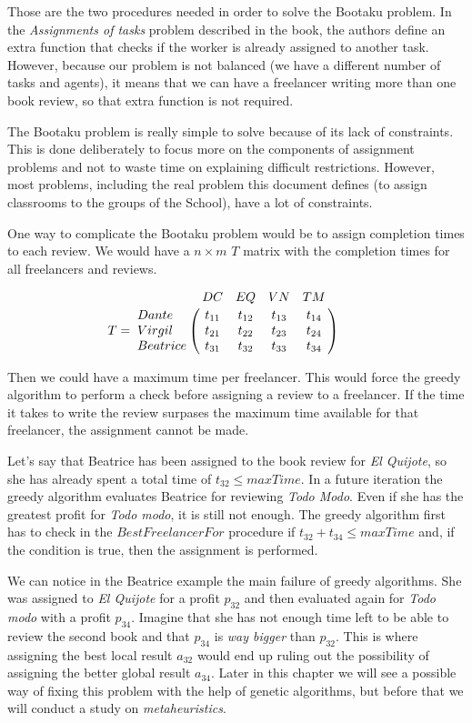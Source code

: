 Those are the two procedures needed in order to solve the Bootaku problem. In the \textit{Assignments of tasks} problem described in the book, the authors define an extra function that checks if the worker is already assigned to another task. However, because our problem is not balanced (we have a different number of tasks and agents), it means that we can have a freelancer writing more than one book review, so that extra function is not required.

The Bootaku problem is really simple to solve because of its lack of constraints. This is done deliberately to focus more on the components of assignment problems and not to waste time on explaining difficult restrictions. However, most problems, including the real problem this document defines (to assign classrooms to the groups of the School), have a lot of constraints. 

One way to complicate the Bootaku problem would be to assign completion times to each review. We would have a $n \times m$ $T$ matrix with the completion times for all freelancers and reviews.

\begin{equation}
    T = \bordermatrix{
        & DC & EQ & VN & TM \cr
        Dante & t_{11} & t_{12} & t_{13} & t_{14} \cr
        Virgil & t_{21} & t_{22} & t_{23} & t_{24} \cr
        Beatrice & t_{31} & t_{32} & t_{33} & t_{34} 
    } \qquad
\end{equation}

Then we could have a maximum time per freelancer. This would force the greedy algorithm to perform a check before assigning a review to a freelancer. If the time it takes to write the review surpases the maximum time available for that freelancer, the assignment cannot be made. 

Let's say that Beatrice has been assigned to the book review for \textit{El Quijote}, so she has already spent a total time of $t_{32} \leq maxTime$. In a future iteration the greedy algorithm evaluates Beatrice for reviewing \textit{Todo Modo}. Even if she has the greatest profit for \textit{Todo modo}, it is still not enough. The greedy algorithm first has to check in the $BestFreelancerFor$ procedure if $t_{32} + t_{34} \leq maxTime$ and, if the condition is true, then the assignment is performed. 

We can notice in the Beatrice example the main failure of greedy algorithms. She was assigned to \textit{El Quijote} for a profit $p_{32}$ and then evaluated again for \textit{Todo modo} with a profit $p_{34}$. Imagine that she has not enough time left to be able to review the second book and that $p_{34}$ is \textit{way bigger} than $p_{32}$. This is where assigning the best local result $a_{32}$ would end up ruling out the possibility of assigning the better global result $a_{34}$. Later in this chapter we will see a possible way of fixing this problem with the help of genetic algorithms, but before that we will conduct a study on \textit{metaheuristics}.



